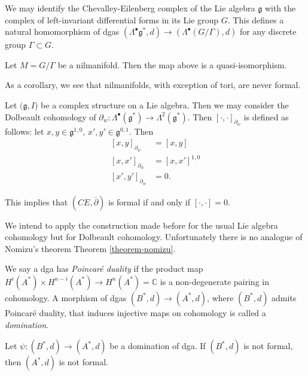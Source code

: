 \noindent
We may identify the Chevalley-Eilenberg
complex of the Lie algebra  $\mathfrak{g}$
with the
complex of left-invariant differential forms
in its
Lie group $G$. This defines a natural
homomorphism of dgas
$(\Lambda^\bullet\mathfrak{g}^*,d) \to
(\Lambda^\bullet(G/\Gamma),d)$
for any discrete group $\Gamma \subset G$.

\begin{theorem}[Nomizu]
\label{theorem-nomizu}
Let $M=G/\Gamma$ be a nilmanifold.
Then the map above is a quasi-isomorphism.
\end{theorem}

As a corollary, we see that nilmanifolds,
with exception of tori, are never formal.

\begin{proposition}
\label{proposition-}
Let $(\mathfrak{g},I$) be a complex structure
on a Lie algebra. Then we may consider the
Dolbeault
cohomology of
$\partial_w:\Lambda^\bullet(\mathfrak{g}^*)
\to\Lambda^2(\mathfrak{g}^*)$.
Then $[\cdot,\cdot]_{\partial_w}$ is defined
as follows: let
$x,y \in \mathfrak{g}^{1,0}$, $x',y' \in
\mathfrak{g}^{0,1}$.
Then
$$
\begin{aligned}
[x,y]_{\partial_w}&=[x,y]\\
[x,x']_{\partial_w}&=[x,x']^{1,0}\\
[x',y']_{\partial_w}&=0.
\end{aligned}
$$
\end{proposition}

\noindent
This implies that $(CE,\overline{\partial})$
is formal if and only if
$[\cdot,\cdot]=0$.

\medskip\noindent
We intend to apply the construction made
before for the usual
Lie algebra cohomology but for Dolbeault
cohomology.
Unfortunately there is no analogue of
Nomizu's theorem Theorem
\ref{theorem-nomizu}.


\medskip\noindent
We say a dga has {\it Poincaré duality} if
the product
map $H^i(A^* ) \times H^{n-i}(A^*)\to
H^n(A^*)=\mathbb{C}$
is a non-degenerate pairing in cohomology.
A morphism of dgas $(B^*,d)\to(A^*,d)$, where
$(B^*,d)$ admits
Poincaré duality, that induces injective maps
on cohomology
is called a {\it domination}.

\begin{theorem}
\label{theorem-msz}
Let $\psi:(B^*,d)\to (A^*,d)$ be a domination
of dga.
If $(B^*,d)$ is not formal, then $(A^*,d)$ is
not formal.
\end{theorem}

